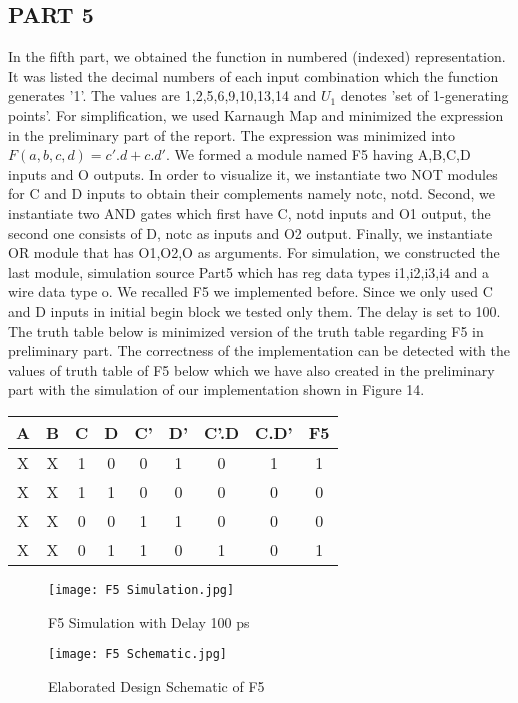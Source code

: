 \documentclass[pdftex,12pt,a4paper]{article}
\begin{document}
\subsection{PART 5}
In the fifth part, we obtained the function in numbered (indexed) representation. It was listed the decimal numbers of each input combination which the function generates '1'. The values are 1,2,5,6,9,10,13,14 and \(U_1\) denotes 'set of 1-generating points'. For simplification, we used Karnaugh Map and minimized the expression in the preliminary part of the report. The expression was minimized into \(F(a, b, c, d) = c'.d + c.d' \). We formed a module named F5 having A,B,C,D inputs and O outputs. In order to visualize it, we instantiate two NOT modules for C and D inputs to obtain their complements namely notc, notd. Second, we instantiate two AND gates  which first have C, notd inputs and O1 output, the second one consists of D, notc as inputs and O2 output. Finally, we instantiate OR module that has O1,O2,O as arguments. For simulation, we constructed the last module, simulation source Part5 which has reg data types i1,i2,i3,i4 and a wire data type o. We recalled F5 we implemented before. Since we only used C and D inputs in initial begin block we tested only them. The delay is set to 100. The truth table below is minimized version of the truth table regarding F5 in preliminary part. The correctness of the implementation can be detected with the values of truth table of F5 below which we have also created in the preliminary part with the simulation of our implementation shown in Figure 14. 


\begin{center}
 \begin{tabular}{|c|c|c|c|c|c|c|c|c|} 
 \hline
 A & B & C & D & C' & D'& C'.D & C.D' & F5 \\ 
 \hline\hline
 X & X & 1 & 0 & 0 & 1 & 0 & 1 & 1 \\ 
 \hline
 X & X & 1 & 1 & 0 & 0 & 0 & 0 & 0 \\
 \hline
 X & X & 0 & 0 & 1 & 1 & 0 & 0 & 0 \\
 \hline
 X & X & 0 & 1 & 1 & 0 & 1 & 0 & 1 \\
 \hline
\end{tabular}
\end{center}

\begin{figure}[ht]
	\centering
	\texttt{[image: F5 Simulation.jpg]}	
	\caption{ F5 Simulation with Delay 100 ps}
	\label{fig1}
\end{figure}
\begin{figure}[ht]
	\centering
	\texttt{[image: F5 Schematic.jpg]}	
	\caption{Elaborated Design Schematic of F5}
	\label{fig1}
\end{figure}
\end{document}
